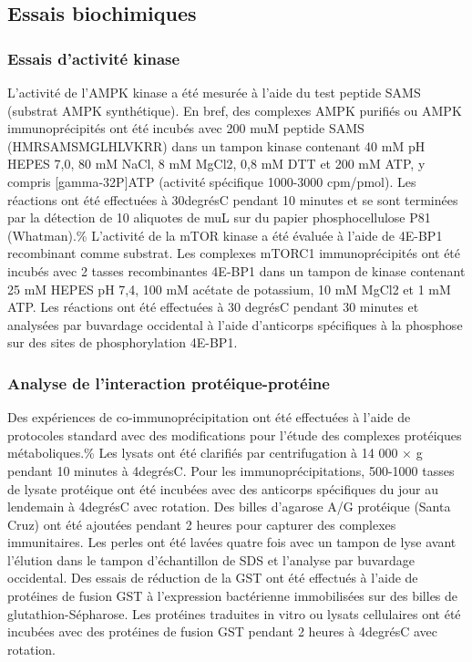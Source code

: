 \documentclass[11pt,a4paper]{article}
\begin{document}
\subsection{Essais biochimiques}

\subsubsection{Essais d'activité kinase}

L'activité de l'AMPK kinase a été mesurée à l'aide du test peptide SAMS (substrat AMPK synthétique). En bref, des complexes AMPK purifiés ou AMPK immunoprécipités ont été incubés avec 200 muM peptide SAMS (HMRSAMSMGLHLVKRR) dans un tampon kinase contenant 40 mM pH HEPES 7,0, 80 mM NaCl, 8 mM MgCl2, 0,8 mM DTT et 200 mM ATP, y compris [gamma-32P]ATP (activité spécifique 1000-3000 cpm/pmol). Les réactions ont été effectuées à 30degrésC pendant 10 minutes et se sont terminées par la détection de 10 aliquotes de muL sur du papier phosphocellulose P81 (Whatman).\% L'activité de la mTOR kinase a été évaluée à l'aide de 4E-BP1 recombinant comme substrat. Les complexes mTORC1 immunoprécipités ont été incubés avec 2 tasses recombinantes 4E-BP1 dans un tampon de kinase contenant 25 mM HEPES pH 7,4, 100 mM acétate de potassium, 10 mM MgCl2 et 1 mM ATP. Les réactions ont été effectuées à 30 degrésC pendant 30 minutes et analysées par buvardage occidental à l'aide d'anticorps spécifiques à la phosphose sur des sites de phosphorylation 4E-BP1.

\subsubsection{Analyse de l'interaction protéique-protéine}

Des expériences de co-immunoprécipitation ont été effectuées à l'aide de protocoles standard avec des modifications pour l'étude des complexes protéiques métaboliques.\% Les lysats ont été clarifiés par centrifugation à 14 000 × g pendant 10 minutes à 4degrésC. Pour les immunoprécipitations, 500-1000 tasses de lysate protéique ont été incubées avec des anticorps spécifiques du jour au lendemain à 4degrésC avec rotation. Des billes d'agarose A/G protéique (Santa Cruz) ont été ajoutées pendant 2 heures pour capturer des complexes immunitaires. Les perles ont été lavées quatre fois avec un tampon de lyse avant l'élution dans le tampon d'échantillon de SDS et l'analyse par buvardage occidental. Des essais de réduction de la GST ont été effectués à l'aide de protéines de fusion GST à l'expression bactérienne immobilisées sur des billes de glutathion-Sépharose. Les protéines traduites in vitro ou lysats cellulaires ont été incubées avec des protéines de fusion GST pendant 2 heures à 4degrésC avec rotation.
\end{document}
